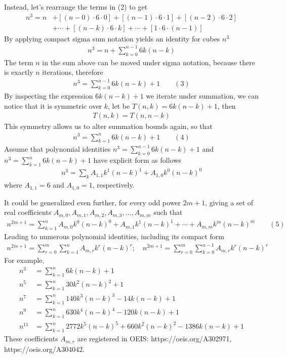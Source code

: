 Instead, let's rearrange the terms in (2) to get
\begin{align*}
    n^3 = n &+ [(n-0) \cdot 6 \cdot 0] + [(n-1)\cdot6\cdot1] + [(n-2)\cdot6\cdot2] \\
    &+ \cdots + [(n-k)\cdot 6 \cdot k] + \cdots + [1\cdot6\cdot(n-1)]
\end{align*}
By applying compact sigma sum notation yields an identity for cubes $n^3$
\begin{align*}
    n^3 = n + \sum_{k=0}^{n-1} 6k(n-k)
\end{align*}
The term $n$ in the sum above can be moved under sigma notation, because there is exactly $n$ iterations, therefore
\begin{align*}
    n^3 = \sum_{k=0}^{n-1} 6k(n-k) + 1 \quad \quad (3)
\end{align*}
By inspecting the expression $6k(n-k) + 1$ we iterate under summation,
we can notice that it is symmetric over $k$, let be $T(n,k) = 6k(n-k) + 1$, then
\begin{align*}
    T(n,k) = T(n,n-k)
\end{align*}
This symmetry allows us to alter summation bounds again, so that
\begin{align*}
    n^3 = \sum_{k=1}^{n} 6k(n-k) + 1 \quad \quad (4)
\end{align*}
Assume that polynomial identities
$n^3 = \sum_{k=0}^{n-1} 6k(n-k) + 1$ and $n^3 = \sum_{k=1}^{n} 6k(n-k) + 1$
have explicit form as follows
\begin{align*}
    n^3 = \sum_{k} A_{1,1} k^1(n-k)^1 + A_{1,0} k^0(n-k)^0
\end{align*}
where $A_{1,1} = 6$ and $A_{1,0} = 1$, respectively.

It could be generalized even further, for every odd power $2m+1$, giving a set of real coefficients
$A_{m,0}, A_{m,1},A_{m,2},A_{m,3}, \ldots, A_{m,m}$ such that
\begin{align*}
    n^{2m+1} = \sum_{k=1}^{n} A_{m,0} k^0 (n-k)^0 + A_{m,1} k^1 (n-k)^1
    + \cdots + A_{m,m} k^m (n-k)^m \quad \quad (5)
\end{align*}
Leading to numerous polynomial identities, including its compact form
\begin{align*}
    n^{2m+1} = \sum_{r=0}^{m} \sum_{k=1}^{n} A_{m,r} k^r (n-k)^r; \quad n^{2m+1} = \sum_{r=0}^{m} \sum_{k=0}^{n-1} A_{m,r} k^r (n-k)^r
\end{align*}
For example,
\begin{align*}
    n^3 &= \sum_{k=1}^{n} 6k(n-k) + 1 \\
    n^5 &= \sum_{k=1}^{n} 30k^2(n-k)^2 + 1 \\
    n^7 &= \sum_{k=1}^{n} 140 k^3 (n-k)^3 - 14k(n-k) + 1 \\
    n^9 &= \sum_{k=1}^{n} 630 k^4(n-k)^4 - 120k(n-k) + 1 \\
    n^{11} &= \sum_{k=1}^{n} 2772 k^5(n-k)^5 + 660 k^2(n-k)^2 - 1386k(n-k) + 1
\end{align*}
These coefficients $A_{m,r}$ are registered in OEIS: https://oeis.org/A302971, https://oeis.org/A304042.

